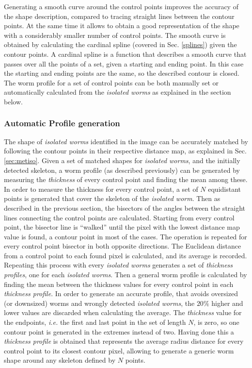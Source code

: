 Generating a smooth curve around the control points improves the accuracy of the shape
description, compared to tracing straight lines
between the contour points. At the same time it allows to obtain a good representation
of the shape with a considerably smaller number of control points. The smooth curve
is obtained by calculating the cardinal spline (covered in Sec. \ref{splines}) given the
contour points. A cardinal spline is a function that describes a smooth curve that
passes over all the points of a set, given a starting and ending point. In this case
the starting and ending points are the same, so the described contour is closed.\\

The worm profile for a set of control points can be both manually set or automatically
calculated from the \emph{isolated worms} as explained in the section below.

\subsubsection{Automatic Profile generation}
\label{sec:metwormprof}

The shape of \emph{isolated worms} identified in the image can be accurately matched
by following the contour points in their respective distance map, as explained 
in Sec. \ref{sec:metiso}. Given a set of matched shapes for \emph{isolated worms}, and
the initially detected skeleton, a worm profile (as described previously) can be 
generated by measuring the \emph{thickness} of every control point and finding the mean
among these.\\

In order to measure the thickness for every control point, a set of
$N$ equidistant points is generated that cover the skeleton of the \emph{isolated worm}.
Then as described in the previous section, the bisectors of the angles between the 
straight lines connecting the control points are calculated. Starting from every control
point, the bisector line is ``walked'' until the pixel with the lowest distance map
value is found, a contour point in most of the cases. The operation is repeated for every 
control point bisector in both opposite directions. The Euclidean distance from a control
point to each found pixel is calculated, and its average is recorded. Repeating this process
with every  \emph{isolated worms} generates a set of \emph{thickness profiles}, one for each
\emph{isolated worms}. Then a general worm profile is calculated by finding the mean between
the thickness values for every control point in each \emph{thickness profile}. In order 
to generate an accurate profile, that avoids oversized (or downsized) worms and wrongly
detected \emph{isolated worms}, the $20\%$ higher and lower values are discarded when 
calculating the average. The \emph{thickness} value for
the endpoints, \emph{i.e.} the first and last point in the set of length $N$, is zero,
so one contour point is generated in the extremes instead of two.
Having done this a \emph{thickness profile} is obtained that represents the average 
radius distance for every control point to its closest contour pixel, allowing 
to generate a generic worm shape around any skeleton defined by $N$ points. 

